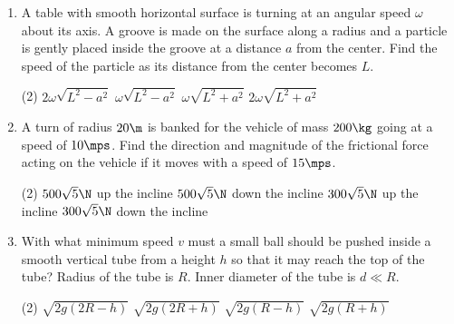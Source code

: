 \documentclass{article}
\renewcommand{\ans}{\quad}
\begin{document}
\begin{enumerate}
    \item A table with smooth horizontal surface is turning at an angular speed $\omega$ about its axis. A groove is made on the surface along a radius and a particle is gently placed inside the groove at a distance $a$ from the center. Find the speed of the particle as its distance from the center becomes $L$.
    \begin{center}
    \end{center}
    \begin{tasks}(2)
        \task $2\omega\sqrt{L^2-a^2}$
        \task $\omega\sqrt{L^2-a^2}$\ans
        \task $\omega\sqrt{L^2+a^2}$
        \task $2\omega\sqrt{L^2+a^2}$
    \end{tasks}

    \item A turn of radius $20\m$ is banked for the vehicle of mass $200\kg$ going at a speed of $10\mps$. Find the direction and magnitude of the frictional force acting on the vehicle if it moves with a speed of $15\mps$.
    \begin{tasks}(2)
        \task $500\sqrt{5}\N$ up the incline
        \task $500\sqrt{5}\N$ down the incline \ans
        \task $300\sqrt{5}\N$ up the incline
        \task $300\sqrt{5}\N$ down the incline
    \end{tasks} 

    \item With what minimum speed $v$ must a small ball should be pushed inside a smooth vertical tube from a height $h$ so that it may reach the top of the tube? Radius of the tube is $R$. Inner diameter of the tube is $d\ll R$.
        \begin{center}
        \end{center}
        \begin{tasks}(2)
            \task $\sqrt{2g\left(2R-h\right)}$\ans
            \task $\sqrt{2g\left(2R+h\right)}$
            \task $\sqrt{2g\left(R-h\right)}$
            \task $\sqrt{2g\left(R+h\right)}$
        \end{tasks}


\end{enumerate}
\end{document}
